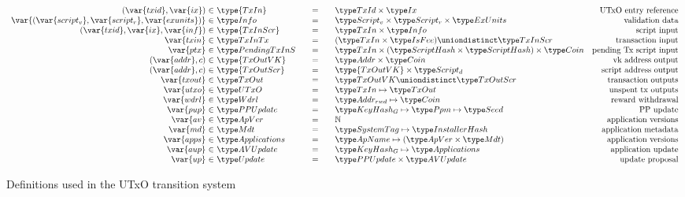 \begin{figure*}[htb]
\begin{equation*}
\begin{array}{r@{~\in~}l@{\qquad=\qquad}lr}
      (\var{txid}, \var{ix})
      & \type{TxIn}
      & \TxId \times \Ix
      & \text{UTxO entry reference}
      \\
      \var{(\var{script_v}, \var{script_r},\var{exunits})}
      & \Info
      & \ScriptV \times \ScriptR \times \ExUnits
      & \text{validation data}
      \\
      (\var{txid}, \var{ix}, \var{inf})
      & \type{TxInScr}
      & \TxIn \times \Info
      & \text{script input}
      \\
      \var{txin}
      & \TxInTx
      & (\TxIn \times \IsFee) \uniondistinct \TxInScr
      & \text{transaction input}
      \\
      \var{ptx}
      & \PendingTxInS
      & \TxIn \times (\HashScr \times \HashScr) \times \Coin
      & \text{pending Tx script input}
      \\
      (\var{addr}, c)
      & \type{TxOutVK}
      & \Addr \times \Coin
      & \text{vk address output}
      \\
      (\var{addr}, c)
      & \type{TxOutScr}
      & \type{TxOutVK} \times \ScriptD
      & \text{script address output}
      \\
      \var{txout}
      & \TxOut
      & \TxOutVK \uniondistinct \TxOutScr
      & \text{transaction outputs}
      \\
      \var{utxo}
      & \UTxO
      & \TxIn \mapsto \TxOut
      & \text{unspent tx outputs}
      \\
      \var{wdrl}
      & \Wdrl
      & \AddrRWD \mapsto \Coin
      & \text{reward withdrawal}
      \\
      \var{pup}
      & \PPUpdate
      & \KeyHashGen \mapsto \Ppm \mapsto \Seed
      & \text{PP update}
      \\
      \var{av}
      & \ApVer
      & \N
      & \text{application versions}
      \\
      \var{md}
      & \Metadata
      & \SystemTag\mapsto\InstallerHash
      & \text{application metadata}
      \\
      \var{apps}
      & \Applications
      & \ApName \mapsto (\ApVer \times \Metadata)
      & \text{application versions}
      \\
      \var{aup}
      & \AVUpdate
      & \KeyHashGen \mapsto \Applications
      & \text{application update}
      \\
      \var{up}
      & \Update
      & \PPUpdate \times \AVUpdate
      & \text{update proposal}
    \end{array}
  \end{equation*}
  \caption{Definitions used in the UTxO transition system}
  \label{fig:defs:utxo-shelley-1}
\end{figure*}

